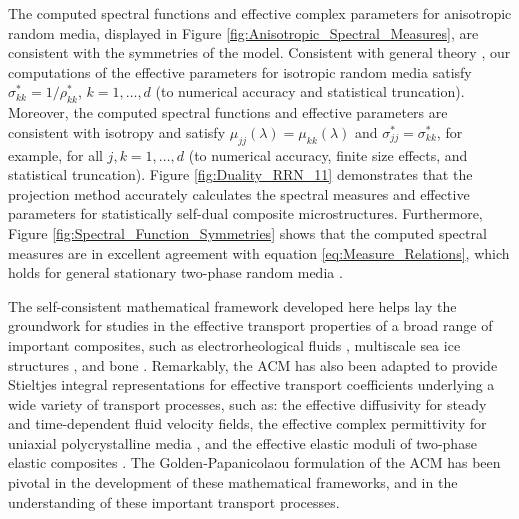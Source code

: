 \documentclass{cmslatex}
\renewcommand{\theequation}{\arabic{section}.\arabic{equation}}
\begin{document}
The computed spectral functions and effective complex parameters for
anisotropic random media, displayed in Figure
\ref{fig:Anisotropic_Spectral_Measures},  are consistent with the
symmetries of the model. Consistent with general theory
\cite{MILTON:2002:TC}, our computations of the effective parameters
for isotropic random media 
satisfy $\sigma^*_{kk}=1/\rho^*_{kk}$, $k=1,\ldots,d$ (to numerical accuracy and
statistical truncation). Moreover, the computed spectral functions and
effective parameters are consistent with isotropy and satisfy
$\mu_{jj}(\lambda)=\mu_{kk}(\lambda)$ and $\sigma^*_{jj}=\sigma^*_{kk}$, for example, for all
$j,k=1,\ldots,d$ (to numerical accuracy, finite size effects, and
statistical truncation). Figure
\ref{fig:Duality_RRN_11} demonstrates that the projection method
accurately calculates the spectral measures and 
effective parameters for statistically self-dual composite
microstructures. Furthermore, Figure
\ref{fig:Spectral_Function_Symmetries} shows that the computed 
spectral measures are in excellent agreement with equation
\eqref{eq:Measure_Relations}, which holds for general stationary
two-phase random media \cite{Murphy:JMP:063506}. 



The self-consistent mathematical framework developed here helps lay
the groundwork for studies in the effective transport properties of a
broad range of important composites, such as electrorheological fluids
\cite{Murphy:PHD_Thesis}, multiscale sea ice structures
\cite{Murphy_Multiscale_Sea_Ice}, and bone
\cite{Golden:JBM:337}. Remarkably, the ACM  has also been adapted to
provide Stieltjes integral representations for  effective transport
coefficients underlying a wide variety of transport processes, such
as: the effective diffusivity for steady
\cite{McLaughlin:SIAM_JAM:780,Avellaneda:CMP-339,Murphy_Advective_Diffusion}
and time-dependent
\cite{Avellaneda:PRE:3249,Murphy_Advective_Diffusion_Dynamic}
fluid velocity fields, the effective complex permittivity for uniaxial
polycrystalline media
\cite{Barabash:JPCM:10323,Gully_Golden_Polycrystalline,Murphy_Polycrystalline_Media_ACM},
and the effective elastic moduli of two-phase elastic composites
\cite{Ou:MMAS:655,Ou:2012:411}. The Golden-Papanicolaou formulation of
the ACM has been pivotal in the development of these mathematical
frameworks, and in the understanding of these important transport
processes.  

  \setcounter{equation}{1}  %
  \setcounter{section}{0}  %
  \renewcommand{\theequation}{A-\arabic{equation}} 
\renewcommand{\thesection}{A-\arabic{section}}
\end{document}
